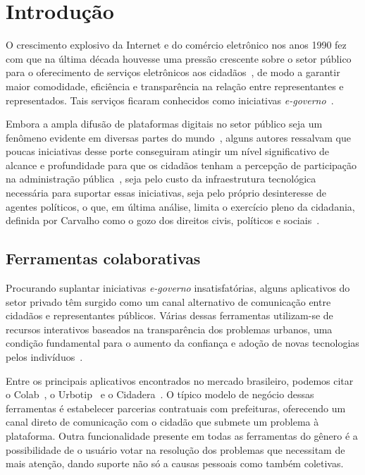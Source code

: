 \documentclass{sigchi}
\begin{document}
\section{Introdução}
O crescimento explosivo da Internet e do comércio eletrônico nos anos 1990 fez com que na última década houvesse uma pressão crescente sobre o setor público para o oferecimento de serviços eletrônicos aos cidadãos~\cite{tat:2002}, de modo a garantir maior comodidade, eficiência e transparência na relação entre representantes e representados. Tais serviços ficaram conhecidos como iniciativas \textit{e-governo}~\cite{carter:2005}.

Embora a ampla difusão de plataformas digitais no setor público seja um fenômeno evidente em diversas partes do mundo~\cite{nam:2011}, alguns autores ressalvam que poucas iniciativas desse porte conseguiram atingir um nível significativo de alcance e profundidade para que os cidadãos tenham a percepção de participação na administração pública~\cite{layne:2001}, seja pelo custo da infraestrutura tecnológica necessária para suportar essas iniciativas, seja pelo próprio desinteresse de agentes políticos, o que, em última análise, limita o exercício pleno da cidadania, definida por Carvalho como o gozo dos direitos civis, políticos e sociais~\cite{carvalho:2001}.

\subsection{Ferramentas colaborativas}
Procurando suplantar iniciativas \textit{e-governo} insatisfatórias, alguns aplicativos do setor privado têm surgido como um canal alternativo de comunicação entre cidadãos e representantes públicos. Várias dessas ferramentas utilizam-se de recursos interativos baseados na transparência dos problemas urbanos, uma condição fundamental para o aumento da confiança e adoção de novas tecnologias pelos indivíduos~\cite{carter:2005}.

Entre os principais aplicativos encontrados no mercado brasileiro, podemos citar o Colab~\cite{colab:2016}, o Urbotip~\cite{urbotip:2016} e o Cidadera~\cite{cidadera:2016}. O típico modelo de negócio dessas ferramentas é estabelecer parcerias contratuais com prefeituras, oferecendo um canal direto de comunicação com o cidadão que submete um problema à plataforma. Outra funcionalidade presente em todas as ferramentas do gênero é a possibilidade de o usuário votar na resolução dos problemas que necessitam de mais atenção, dando suporte não só a causas pessoais como também coletivas. 
\end{document}
